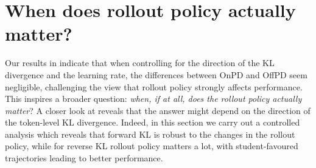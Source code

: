 \documentclass{article} %
\theoremstyle{plain}
\theoremstyle{definition}
\theoremstyle{remark}
\begin{document}


\section{When does rollout policy actually matter?}
\label{sec:rollout_spectrum}

Our results in  indicate that when controlling for the direction of the KL divergence and the learning rate, the differences between OnPD and OffPD seem negligible, challenging the view that rollout policy strongly affects performance. This inspires a broader question: \textit{when, if at all, does the rollout policy actually matter}? A closer look at  reveals that the answer might depend on the direction of the token-level KL divergence. Indeed, in this section we carry out a controlled analysis which reveals that forward KL is robust to the changes in the rollout policy, while for reverse KL rollout policy matters a lot, with student-favoured trajectories leading to better performance.

\end{document}
